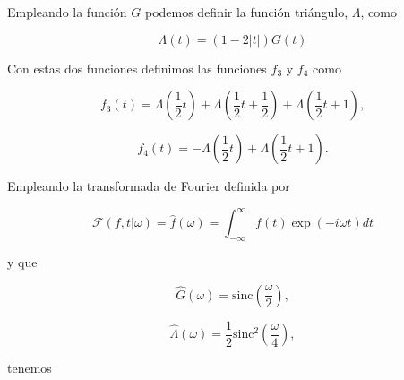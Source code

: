 \documentclass[a4paper,12pt,final]{article}
\begin{document}
      \noindent Empleando la función $G$ podemos definir la función triángulo,
      $\Lambda$, como

      \begin{equation*}
         \Lambda\left(t\right) = \left(1 - 2\left|t\right|\right)G\left(t\right)
      \end{equation*}

      \noindent Con estas dos funciones definimos las funciones $f_3$ y $f_4$
      como

      \begin{equation*}
         f_3\left(t\right) = \Lambda\left(\frac{1}{2}t\right) +
                             \Lambda\left(\frac{1}{2}t + \frac{1}{2}\right) +
                             \Lambda\left(\frac{1}{2}t + 1\right),
      \end{equation*}

      \begin{equation*}
         f_4\left(t\right) = - \Lambda\left(\frac{1}{2}t\right) +
                               \Lambda\left(\frac{1}{2}t + 1\right).
      \end{equation*}

      \noindent Empleando la transformada de Fourier definida por

      \begin{equation*}
        \mathcal{F}\left(f,t|\omega\right) = \widehat{f}\left(\omega\right) = \int_{-\infty}^{\infty}f\left(t\right)\exp\left(- i \omega t\right)dt
      \end{equation*}

      \noindent y que

      \begin{equation*}
        \widehat{G}\left(\omega\right) = \mathrm{sinc}\left(\frac{\omega}{2}\right),
      \end{equation*}

      \begin{equation*}
        \widehat{\Lambda}\left(\omega\right) = \frac{1}{2}\mathrm{sinc}^{2}\left(\frac{\omega}{4}\right),
      \end{equation*}

      \noindent tenemos
\end{document}
